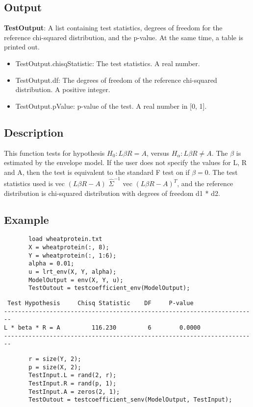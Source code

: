 \documentclass[a4paper,11pt,openany]{memoir}
\begin{document}
\subsection*{Output}

\begin{par}
\textbf{TestOutput}: A list containing test statistics, degrees of freedom for the reference chi-squared distribution, and the p-value.  At the same time, a table is printed out.
\end{par} \vspace{1em}
\begin{itemize}
\setlength{\itemsep}{-1ex}
   \item TestOutput.chisqStatistic: The test statistics. A real number.
   \item TestOutput.df: The degrees of freedom of the reference chi-squared distribution.  A positive integer.
   \item TestOutput.pValue: p-value of the test.  A real number in [0, 1].
\end{itemize}


\subsection*{Description}

\begin{par}
This function tests for hypothesis $H_0: L\beta R = A$, versus $H_\alpha: L\beta R\neq A$.  The $\beta$ is estimated by the envelope model.  If the user does not specify the values for L, R and A, then the test is equivalent to the standard F test on if $\beta = 0$.  The test statistics used is vec $(L\beta R - A)$ $\hat{\Sigma}^{-1}$ vec $(L\beta R - A)^{T}$, and the reference distribution is chi-squared distribution with degrees of freedom d1 * d2.
\end{par} \vspace{1em}


\subsection*{Example}


\begin{verbatim}       load wheatprotein.txt
       X = wheatprotein(:, 8);
       Y = wheatprotein(:, 1:6);
       alpha = 0.01;
       u = lrt_env(X, Y, alpha);
       ModelOutput = env(X, Y, u);
       TestOutout = testcoefficient_env(ModelOutput);
       \end{verbatim}
        \color{lightgray}\ttfamily \begin{verbatim}
 Test Hypothesis     Chisq Statistic    DF     P-value
------------------------------------------------------------------------
L * beta * R = A         116.230         6        0.0000
------------------------------------------------------------------------
\end{verbatim} \rmfamily
\color{black}       
\begin{verbatim}
       r = size(Y, 2);
       p = size(X, 2);
       TestInput.L = rand(2, r);
       TestInput.R = rand(p, 1);
       TestInput.A = zeros(2, 1);
       TestOutout = testcoefficient_senv(ModelOutput, TestInput);\end{verbatim}
    
\end{document}

